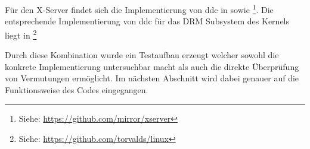 Für den X-Server findet sich die Implementierung von \acrshort{ddc} in  sowie \footnote{Siehe: \url{https://github.com/mirror/xserver}}.
Die entsprechende Implementierung von \acrshort{ddc} für das DRM Subsystem des Kernels liegt in \footnote{Siehe: \url{https://github.com/torvalds/linux}}

Durch diese Kombination wurde ein Testaufbau erzeugt welcher sowohl die konkrete Implementierung untersuchbar macht als auch die direkte Überprüfung von Vermutungen ermöglicht.
Im nächsten Abschnitt wird dabei genauer auf die Funktionsweise des Codes eingegangen. 





